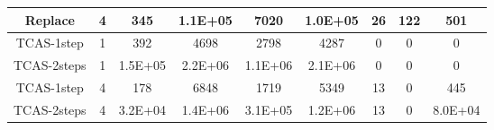 \begin{table}[]
\begin{tabular}{@{}ccccccccc@{}}
        Replace                                                     & 4                                                            & 345                                                        & 1.1E+05                                                     & 7020                                                           & 1.0E+05                                                        & 26                                                         & 122                                                           & 501      \\ \midrule \midrule
        TCAS-1step                                                  & 1                                                            & 392                                                        & 4698                                                        & 2798                                                           & 4287                                                           & 0                                                          & 0                                                             & 0        \\ \midrule
        TCAS-2steps                                                 & 1                                                            & 1.5E+05                                                    & 2.2E+06                                                     & 1.1E+06                                                        & 2.1E+06                                                        & 0                                                          & 0                                                             & 0        \\ \midrule
        TCAS-1step                                                  & 4                                                            & 178                                                        & 6848                                                        & 1719                                                           & 5349                                                           & 13                                                         & 0                                                             & 445      \\ \midrule
        TCAS-2steps                                                 & 4                                                            & 3.2E+04                                                    & 1.4E+06                                                     & 3.1E+05                                                        & 1.2E+06                                                        & 13                                                         & 0                                                             & 8.0E+04  \\ \midrule

\end{tabular}
\end{table}
